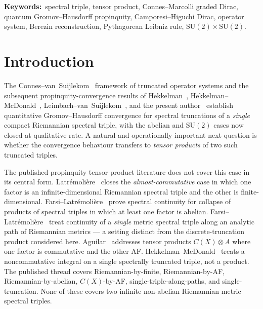 \documentclass[11pt,a4paper]{article}
\theoremstyle{plain}
\theoremstyle{definition}
\newcommand{\SU}{\mathrm{SU}}
\begin{document}
\medskip\noindent
\textbf{Keywords:}\ spectral triple, tensor product, Connes--Marcolli
graded Dirac, quantum Gromov--Hausdorff propinquity, Camporesi--Higuchi
Dirac, operator system, Berezin reconstruction, Pythagorean Leibniz
rule, $\SU(2) \times \SU(2)$.

\section{Introduction}\label{sec:intro}

The Connes--van~Suijlekom~\cite{connes_vs2021} framework of truncated
operator systems and the subsequent propinquity-convergence results of
Hekkelman~\cite{hekkelman2022}, Hekkelman--McDonald~\cite{hekkelman_mcdonald2024},
Leimbach--van~Suijlekom~\cite{leimbach_vs2024}, and the present
author~\cite{loutey_paper38} establish quantitative
Gromov--Hausdorff convergence for spectral truncations of a
\emph{single} compact Riemannian spectral triple, with the abelian and
$\SU(2)$ cases now closed at qualitative rate. A natural and
operationally important next question is whether the convergence
behaviour transfers to \emph{tensor products} of two such truncated
triples.

The published propinquity tensor-product literature does not cover
this case in its central form. Latr\'emoli\`ere~\cite{latremoliere2026}
closes the \emph{almost-commutative} case in which one factor is an
infinite-dimensional Riemannian spectral triple and the other is
finite-dimensional. Farsi--Latr\'emoli\`ere~\cite{farsi_latremoliere2024}
prove spectral continuity for collapse of products of spectral triples
in which at least one factor is abelian.
Farsi--Latr\'emoli\`ere~\cite{farsi_latremoliere2025} treat
continuity of a \emph{single} metric spectral triple along an analytic
path of Riemannian metrics --- a setting distinct from the
discrete-truncation product considered here.
Aguilar~\cite{aguilar2019} addresses tensor products $C(X) \otimes A$
where one factor is commutative and the other AF.
Hekkelman--McDonald~\cite{hekkelman_mcdonald2024b} treats a
noncommutative integral on a single spectrally truncated triple, not a
product. The published thread covers Riemannian-by-finite,
Riemannian-by-AF, Riemannian-by-abelian, $C(X)$-by-AF,
single-triple-along-paths, and single-truncation. None of these covers
two infinite non-abelian Riemannian metric spectral triples.
\end{document}
